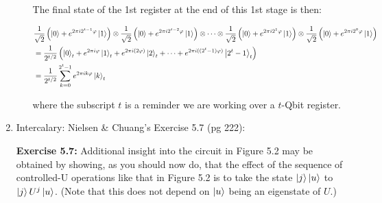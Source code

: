\documentclass{article}
\begin{document}
\begin{enumerate}[label=\textbf{(\arabic*)}]
\begin{itemize}
  \vspace{0.05in}
  
  The final state of the 1st register at the end of this 1st stage is then:

  \begin{align}
      \label{eq:1st_stage_1st_register}
      &\frac{1}{\sqrt{2}}\left(\ket{0}+e^{2\pi i 2^{t-1}\varphi}\ket{1}\right)
      \otimes
      \frac{1}{\sqrt{2}}\left(\ket{0}+e^{2\pi i 2^{t-2}\varphi}\ket{1}\right)
      \otimes
      \cdots
      \otimes
      \frac{1}{\sqrt{2}}\left(\ket{0}+e^{2\pi i 2^1\varphi}\ket{1}\right)
      \otimes
      \frac{1}{\sqrt{2}}\left(\ket{0}+e^{2\pi i 2^0\varphi}\ket{1}\right)\\
      &=
      \frac{1}{2^{t/2}}\left(
      \ket{0}_{t}
      + e^{2\pi i \varphi}\ket{1}_{t}
      + e^{2\pi i (2\varphi)}\ket{2}_{t}
      + \cdots
      + e^{2\pi i ((2^t-1)\varphi)}\ket{2^t-1}_{t}
      \right)\\
      &=
      \frac{1}{2^{t/2}}
      \sum_{k=0}^{2^t-1}
      e^{2\pi i k\varphi}\ket{k}_{t}
  \end{align}
  
  where the subscript $t$ is a reminder we are working over a $t$-Qbit register.
  
\end{itemize}


\item Intercalary: Nielsen \& Chuang's Exercise 5.7 (pg 222):
\vspace{0.1in}
\begin{adjustwidth}{100pt}{100pt}
\begin{mdframed}[hidealllines=true, backgroundcolor=gray!20]
\textbf{Exercise 5.7:} Additional insight into the circuit in Figure 5.2 may be obtained by showing, as you should now do, that the effect of the sequence of controlled-U operations like that in Figure 5.2 is to take the state $\ket{j}\ket{u}$ to $\ket{j}U^{j}\ket{u}$. (Note that this does not depend on $\ket{u}$ being an eigenstate of $U$.)
\end{mdframed}
\end{adjustwidth}


\end{enumerate}
\end{document}
